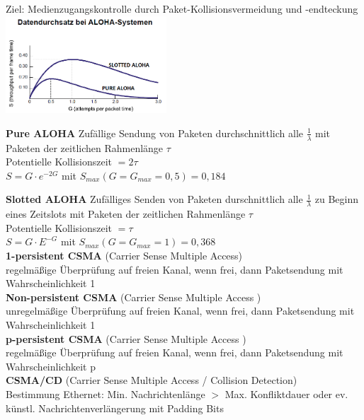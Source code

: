 \documentclass[fs, footer]{latex4ei}
\begin{document}
\begin{multicols*}{4}
{	Ziel: Medienzugangskontrolle durch Paket-Kollisionsvermeidung und -endteckung \\


	\includegraphics[width = 6cm]{./img/ALOHA_Datendurchsatz.png}


	\textbf{Pure ALOHA}
		Zufällige Sendung von Paketen durchschnittlich alle $\frac{1}{\lambda}$ mit Paketen der zeitlichen Rahmenlänge $ \tau $ \\
		
		Potentielle Kollisionszeit $ = 2 \tau $ \\
		$ S = G \cdot e^{-2G} $ mit $ S_{max}(G = G_{max} = 0,5) = 0,184 $

	\textbf{Slotted ALOHA}
		Zufälliges Senden von Paketen durschnittlich alle $\frac{1}{\lambda}$ zu Beginn eines Zeitslots mit Paketen der zeitlichen Rahmenlänge $ \tau $ \\
		
		Potentielle Kollisionszeit $ = \tau $ \\
		$ S = G \cdot E^{-G} $ mit $ S_{max}(G = G_{max} = 1) = 0,368 $ \\
		
	\textbf{1-persistent CSMA} (Carrier Sense Multiple Access) \\
		regelmäßige Überprüfung auf freien Kanal, wenn frei, dann Paketsendung mit Wahrscheinlichkeit 1 \\
		
	\textbf{Non-persistent CSMA} (Carrier Sense Multiple Access ) \\
		unregelmäßige Überprüfung auf freien Kanal, wenn frei, dann Paketsendung mit Wahrscheinlichkeit 1 \\
	
	\textbf{p-persistent CSMA} (Carrier Sense Multiple Access )  \\
		regelmäßige Überprüfung auf freien Kanal, wenn frei, dann Paketsendung mit Wahrscheinlichkeit p \\
		
	\textbf{CSMA/CD} (Carrier Sense Multiple Access / Collision Detection) \\
		Bestimmung Ethernet:  Min. Nachrichtenlänge $ > $  Max. Konfliktdauer oder ev. künstl. Nachrichtenverlängerung mit Padding Bits \\

}
\end{multicols*}
\end{document}
